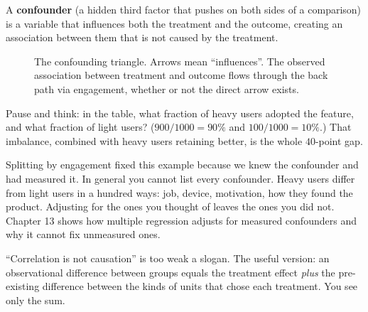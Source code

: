 \begin{definition}[Confounder]
A \textbf{confounder} (a hidden third factor that pushes on both sides of a
comparison) is a variable that influences both the treatment and the outcome,
creating an association between them that is not caused by the treatment.
\end{definition}

\begin{figure}[H]
\centering
{}
\caption{The confounding triangle. Arrows mean ``influences''. The observed association
between treatment and outcome flows through the back path via engagement, whether or
not the direct arrow exists.}
\label{fig:sampling-confound-dag}
\end{figure}

\begin{recoverybox}
Pause and think: in the table, what fraction of heavy users adopted the feature, and what
fraction of light users? ($900/1000 = 90\%$ and $100/1000 = 10\%$.) That imbalance,
combined with heavy users retaining better, is the whole $40$-point gap.
\end{recoverybox}

Splitting by engagement fixed this example because we knew the confounder and had
measured it. In general you cannot list every confounder. Heavy users differ from light
users in a hundred ways: job, device, motivation, how they found the product. Adjusting
for the ones you thought of leaves the ones you did not. Chapter 13 shows how multiple
regression adjusts for measured confounders and why it cannot fix unmeasured ones.

\begin{trapbox}
``Correlation is not causation'' is too weak a slogan. The useful version: an
observational difference between groups equals the treatment effect \emph{plus} the
pre-existing difference between the kinds of units that chose each treatment. You see
only the sum.
\end{trapbox}


